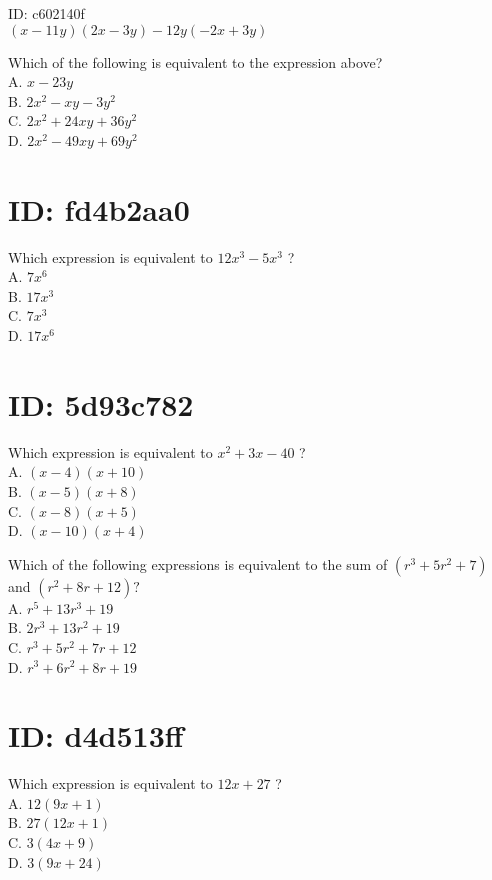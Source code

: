 ID: c602140f\\
$(x-11 y)(2 x-3 y)-12 y(-2 x+3 y)$

Which of the following is equivalent to the expression above?\\
A. $x-23 y$\\
B. $2 x^{2}-x y-3 y^{2}$\\
C. $2 x^{2}+24 x y+36 y^{2}$\\
D. $2 x^{2}-49 x y+69 y^{2}$

\section*{ID: fd4b2aa0}
Which expression is equivalent to $12 x^{3}-5 x^{3}$ ?\\
A. $7 x^{6}$\\
B. $17 x^{3}$\\
C. $7 x^{3}$\\
D. $17 x^{6}$

\section*{ID: 5d93c782}
Which expression is equivalent to $x^{2}+3 x-40$ ?\\
A. $(x-4)(x+10)$\\
B. $(x-5)(x+8)$\\
C. $(x-8)(x+5)$\\
D. $(x-10)(x+4)$

Which of the following expressions is equivalent to the sum of $\left(r^{3}+5 r^{2}+7\right)$ and $\left(r^{2}+8 r+12\right) ?$\\
A. $r^{5}+13 r^{3}+19$\\
B. $2 r^{3}+13 r^{2}+19$\\
C. $r^{3}+5 r^{2}+7 r+12$\\
D. $r^{3}+6 r^{2}+8 r+19$

\section*{ID: d4d513ff}
Which expression is equivalent to $12 x+27$ ?\\
A. $12(9 x+1)$\\
B. $27(12 x+1)$\\
C. $3(4 x+9)$\\
D. $3(9 x+24)$


